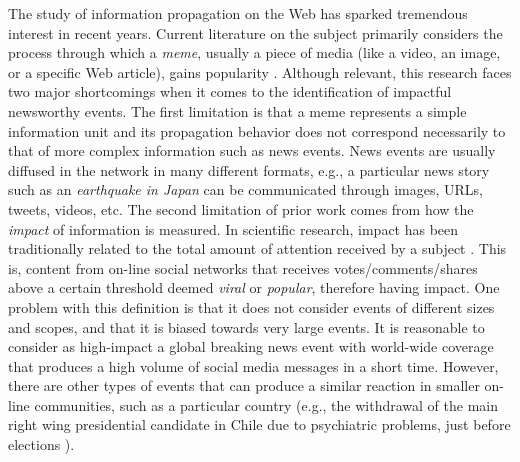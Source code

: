 \documentclass[10pt,letterpaper]{article}
\begin{document}
The study of information propagation on the Web has sparked tremendous
interest in recent years. Current literature on the subject primarily
considers the process through which a {\em meme}, usually a piece of
media (like a video, an image, or a specific Web article), gains
popularity
\cite{Castillo:2014,Szabo:2010,Lerman:2010,Tatar2014,Pinto:2013,Ahmed:2013,Li:2016:concept:drift,
Liu:2015:UN}.  
Although relevant, this research faces two major
shortcomings when it comes to the identification of impactful
newsworthy events.  The first limitation is that a meme represents a
simple information unit and its propagation behavior does not
correspond necessarily to that of more complex information such as
news events. News events are usually diffused in the network in many
different formats, e.g., a particular news story such as an {\em
  earthquake in Japan} can be communicated through images, URLs,
tweets, videos, etc. The second limitation of prior work comes from
how the {\em impact} of information is measured. In scientific
research, impact has been traditionally related to the total amount of
attention received by a subject
\cite{berger2012makes,iribarren2011branching,guerini2011exploring,mills2012virality,gaugaz2012predicting}.
This is, content from on-line social networks that receives
votes/comments/shares above a certain threshold deemed {\em viral} or
{\em popular}, therefore having impact. One problem with this
definition is that it does not consider events of different sizes and
scopes, and that it is biased towards very large events. It is
reasonable to consider as high-impact a global breaking news event
with world-wide coverage that produces a high volume of social media
messages in a short time.  However, there are other types of events
that can produce a similar reaction in smaller on-line communities,
such as a particular country
(e.g., the
withdrawal of the main right wing presidential candidate in Chile due
to psychiatric problems, just before
elections \cite{chile_elections}).
\end{document}
